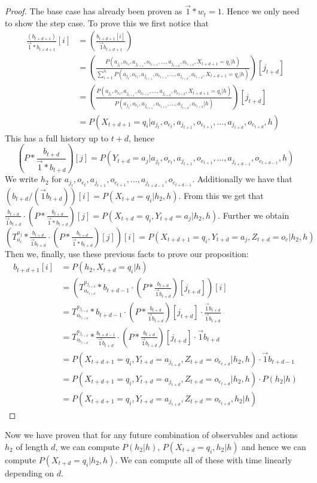 \documentclass{article}
\theoremstyle{definition}
\begin{document}
\begin{proof} 
The base case has already been proven as $\vec{1}*w_t=1$.  Hence we only need to show the step case. To prove this we first notice that 
\begin{align*}
 \frac{(b_{t+d+1})}{\vec{1}*b_{t+d+1}}[i]&=(\frac{b_{t+d+1}[i]}{\vec{1}b_{t+d+1}}) \\
&=(\frac{P(a_{j_t},o_{e_t},a_{j_{t+1}},o_{e_{t+1}},\ldots,a_{j_{t+d}},o_{e_{t+d}},X_{t+d+1}=q_i|h)}{\sum\limits_{i=1}^{n} P(a_{j_t},o_{e_t},a_{j_{t+1}},o_{e_{t+1}},\ldots,a_{j_{t+d}},o_{e_{t+d}},X_{t+d+1}=q_i|h)})[j_{t+d}] \\
&=(\frac{P(a_{j_t},o_{e_t},a_{j_{t+1}},o_{e_{t+1}},\ldots,a_{j_{t+d}},o_{e_{t+d}},X_{t+d+1}=q_i|h)}{ P(a_{j_t},o_{e_t},a_{j_{t+1}},o_{e_{t+1}},\ldots,a_{j_{t+d}},o_{e_{t+d}}|h)})[j_{t+d}] \\
&=P(X_{t+d+1}=q_i|a_{j_t},o_{e_t},a_{j_{t+1}},o_{e_{t+1}},\ldots,a_{j_{t+d}},o_{e_{t+d}},h)
\end{align*}
This has a full history up to $t+d$, hence 
\[(P*\frac{b_{t+d}}{\vec{1}*b_{t+d}})[j]=P(Y_{t+d}=a_j|a_{j_t},o_{e_t},a_{j_{t+1}},o_{e_{t+1}},\ldots,a_{j_{t+d-1}},o_{e_{t+d-1}},h)\]
We write $h_2$ for $a_{j_t},o_{e_t},a_{j_{t+1}},o_{e_{t+1}},\ldots,a_{j_{t+d-1}},o_{e_{t+d-1}}$.
Additionally we have that $(b_{t+d}/(\vec{1}b_{t+d}))[i]=P(X_{t+d}=q_i|h_2,h)$. 
From this we get that $\frac{b_{t+d}}{\vec{1}b_{t+d}}\cdot (P*\frac{b_{t+d}}{\vec{1}*b_{t+d}})[j]=P(X_{t+d}=q_i,Y_{t+d}=a_j|h_2,h)$.
Further we obtain $(T^{a_j}_{o_e}*\frac{b_{t+d}}{\vec{1}b_{t+d}}\cdot (P*\frac{b_{t+d}}{\vec{1}*b_{t+d}})[j])[i]=P(X_{t+d+1}=q_i,Y_{t+d}=a_j,Z_{t+d}=o_e|h_2,h)$
Then we, finally, use these previous facts to prove our proposition:
\begin{align*}
b_{t+d+1}[i]&=P(h_2,X_{t+d}=q_i|h) \\
&=(T^{a_{j_{t+d}}}_{o_{e_{t+d}}}*b_{t+d-1}\cdot (P*\frac{b_{t+d}}{\vec{1}b_{t+d}})[j_{t+d}])[i]\\
&=T^{a_{j_{t+d}}}_{o_{e_{t+d}}}*b_{t+d-1}\cdot (P*\frac{b_{t+d}}{\vec{1}b_{t+d}})[j_{t+d}]\cdot\frac{\vec{1}b_{t+d}}{\vec{1}b_{t+d}} \\
&=T^{a_{j_{t+d}}}_{o_{e_{t+d}}}*\frac{b_{t+d-1}}{\vec{1}b_{t+d}}\cdot (P*\frac{b_{t+d}}{\vec{1}b_{t+d}})[j_{t+d}]\cdot \vec{1}b_{t+d} \\
&=P(X_{t+d+1}=q_i,Y_{t+d}=a_{j_{t+d}},Z_{t+d}=o_{e_{t+d}}|h_2,h)\cdot \vec{1}b_{t+d-1} \\
&=P(X_{t+d+1}=q_i,Y_{t+d}=a_{j_{t+d}},Z_{t+d}=o_{e_{t+d}}|h_2,h)\cdot P(h_2|h)\\
&=P(X_{t+d+1}=q_i,Y_{t+d}=a_{j_{t+d}},Z_{t+d}=o_{e_{t+d}},h_2|h)
\end{align*}
\end{proof}
Now we have proven that for any future combination of observables and actions $h_2$ of length $d$, we can compute $P(h_2|h)$, $P(X_{t+d}=q_i,h_2|h)$ and hence we can compute $P(X_{t+d}=q_i|h_2,h)$. We can compute all of these with time linearly depending on $d$. 
\end{document}
